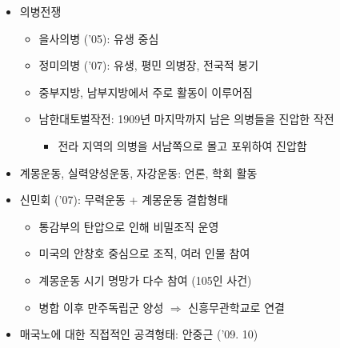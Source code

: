 \begin{itemize}
    \item 의병전쟁
    \begin{itemize}
        \item 을사의병 ('05): 유생 중심
        \item 정미의병 ('07): 유생, 평민 의병장, 전국적 봉기
        \item 중부지방, 남부지방에서 주로 활동이 이루어짐
        \item 남한대토벌작전: 1909년 마지막까지 남은 의병들을 진압한 작전
        \begin{itemize}
            \item 전라 지역의 의병을 서남쪽으로 몰고 포위하여 진압함
        \end{itemize}
    \end{itemize}
    \item 계몽운동, 실력양성운동, 자강운동: 언론, 학회 활동
    \newpage
    \item 신민회 ('07): 무력운동 + 계몽운동 결합형태
    \begin{itemize}
        \item 통감부의 탄압으로 인해 비밀조직 운영
        \item 미국의 안창호 중심으로 조직, 여러 인물 참여
        \item 계몽운동 시기 명망가 다수 참여 (105인 사건)
        \item 병합 이후 만주독립군 양성 $\Rightarrow$ 신흥무관학교로 연결
    \end{itemize}
    \item 매국노에 대한 직접적인 공격형태: 안중근 ('09. 10)
\end{itemize}
